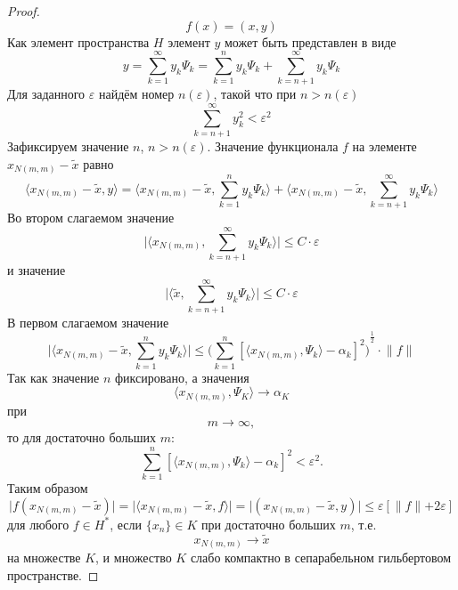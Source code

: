 \documentclass[12pt,a4paper,titlepage,oneside]{book}
\theoremstyle{definition}
\theoremstyle{plain}
\theoremstyle{break}
\theoremstyle{remark}
\theoremstyle{remark}
\theoremstyle{remark}
\theoremstyle{remark}
\theoremstyle{plain}
\theoremstyle{plain}
\begin{document}
\begin{proof}
\begin{equation*}
f(x)=(x,y)
\end{equation*}
Как элемент пространства $H$ элемент $y$ может быть представлен в виде 
\begin{equation*}
y=\sum\limits_{k=1}^\infty y_k\Psi_k =
\sum\limits_{k=1}^n y_k\Psi_k +
\sum\limits_{k=n+1}^\infty y_k\Psi_k
\end{equation*}
Для заданного $\varepsilon$ найдём номер $n(\varepsilon)$, такой что при $n>n(\varepsilon)$
\begin{equation*}
\sum\limits_{k=n+1}^\infty y_k^2 < {\varepsilon}^2 
\end{equation*}
Зафиксируем значение $n$, $n>n(\varepsilon)$.
Значение функционала $f$ на элементе $x_{N(m,m)}-\widetilde{x}$ равно
\begin{equation*}
 \langle x_{N(m,m)}-\widetilde{x},y \rangle = 
 \langle x_{N(m,m)}-\widetilde{x},\sum\limits_{k=1}^n y_k\Psi_k \rangle +
 \langle x_{N(m,m)}-\widetilde{x},\sum\limits_{k=n+1}^\infty y_k\Psi_k \rangle 
\end{equation*}
Во втором слагаемом значение
\begin{equation*}
\vert  \langle x_{N(m,m)},\sum\limits_{k=n+1}^\infty y_k\Psi_k \rangle  \vert \leqslant
C\cdot\varepsilon
\end{equation*}
и значение 
\begin{equation*}
\vert  \langle \widetilde{x},\sum\limits_{k=n+1}^\infty y_k\Psi_k \rangle  \vert \leqslant
C\cdot\varepsilon
\end{equation*}
В первом слагаемом значение
\begin{equation*}
\vert  \langle x_{N(m,m)}-\widetilde{x},
\sum\limits_{k=1}^n y_k\Psi_k \rangle  \vert \leqslant
{ \Big( \sum\limits_{k=1}^n{[ \langle x_{N(m,m)},\Psi_k \rangle  - \alpha_k]}^2 \Big) }^{\frac{1}{2}}\cdot
 \lVert f\lVert
\end{equation*}
Так как значение $n$ фиксировано, а значения
$$\langle x_{N(m,m)},\Psi_K \rangle  \to \alpha_K$$
при
$$m\to\infty,$$
то для достаточно больших $m$:
\begin{equation*}
\sum\limits_{k=1}^n{[ \langle x_{N(m,m)},\Psi_k \rangle  - \alpha_k]}^2 < \varepsilon^2.
\end{equation*}
Таким образом
\begin{equation*}
\vert f(x_{N(m,m)}-\widetilde{x})\vert=
\vert  \langle x_{N(m,m)}-\widetilde{x},f \rangle  \vert =
\vert (x_{N(m,m)}-\widetilde{x},y) \vert \leqslant
\varepsilon [\lVert f\lVert + 2\varepsilon]
\end{equation*}
для любого $f \in H^*$, если
 $\lbrace x_n\rbrace \in K$ при достаточно больших $m$, т.е. 
\begin{equation*}
x_{N(m,m)} \to \widetilde{x}
\end{equation*}
на множестве $K$, и множество $K$ слабо компактно в сепарабельном гильбертовом пространстве.
\end{proof}
\end{document}
